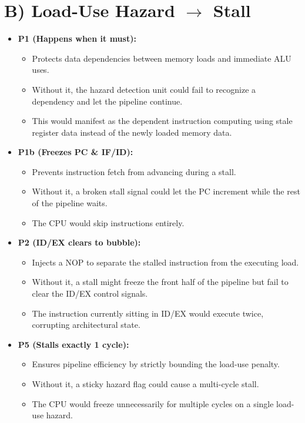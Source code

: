 \documentclass[11pt]{article}
\begin{document}
\section*{B) Load-Use Hazard $\rightarrow$ Stall}
\begin{itemize}
    \item \textbf{P1 (Happens when it must):} 
    \begin{itemize}
        \item Protects data dependencies between memory loads and immediate ALU uses.
        \item Without it, the hazard detection unit could fail to recognize a dependency and let the pipeline continue.
        \item This would manifest as the dependent instruction computing using stale register data instead of the newly loaded memory data.
    \end{itemize}

    \item \textbf{P1b (Freezes PC \& IF/ID):} 
    \begin{itemize}
        \item Prevents instruction fetch from advancing during a stall.
        \item Without it, a broken stall signal could let the PC increment while the rest of the pipeline waits.
        \item The CPU would skip instructions entirely.
    \end{itemize}

    \item \textbf{P2 (ID/EX clears to bubble):} 
    \begin{itemize}
        \item Injects a NOP to separate the stalled instruction from the executing load.
        \item Without it, a stall might freeze the front half of the pipeline but fail to clear the ID/EX control signals.
        \item The instruction currently sitting in ID/EX would execute twice, corrupting architectural state.
    \end{itemize}

    \item \textbf{P5 (Stalls exactly 1 cycle):} 
    \begin{itemize}
        \item Ensures pipeline efficiency by strictly bounding the load-use penalty.
        \item Without it, a sticky hazard flag could cause a multi-cycle stall.
        \item The CPU would freeze unnecessarily for multiple cycles on a single load-use hazard.
    \end{itemize}
\end{itemize}
\end{document}
